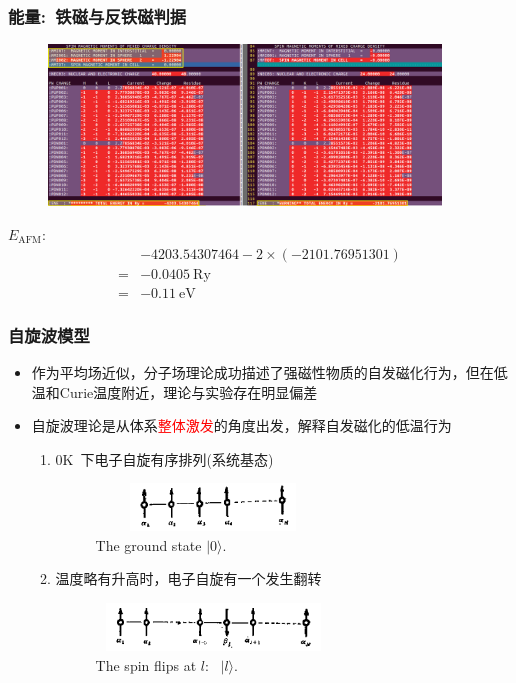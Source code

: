 {\frame
{
	\frametitle{能量:~铁磁与反铁磁判据}
\vspace*{-8pt}
\begin{figure}[h!]
\centering
\includegraphics[width=4.1in]{Figures/WIEN2k_AFM_Cr-6.png}
\label{Fig:WIEN2k_AFM-Cr-6}
\end{figure}
$E_{\mathrm{AFM}}$:
\begin{displaymath}
	\begin{aligned}
		&-4203.54307464-2\times(-2101.76951301)\\
		=&-0.0405~\mathrm{Ry}\\
		=&-0.11~\mathrm{eV}
	\end{aligned}
\end{displaymath}
}

\frame
{
	\frametitle{自旋波模型}
	\begin{itemize}
		\item 作为平均场近似，分子场理论成功描述了强磁性物质的自发磁化行为，但在低温和\textrm{Curie}温度附近，理论与实验存在明显偏差
		\item 自旋波理论是从体系\textcolor{red}{整体激发}的角度出发，解释自发磁化的低温行为
			\begin{enumerate}
				\item 0\textrm{K~}下电子自旋有序排列(系统基态)
\begin{figure}[h!]
\centering
\includegraphics[height=0.50in,width=2.45in,viewport=10 10 600 150,clip]{Figures/Mag_spinwave-0.png}
\caption{\tiny \textrm{The ground state $|0\rangle$.}}%
\label{Mag_spinwave-0}
\end{figure}
				\item 温度略有升高时，电子自旋有一个发生翻转
\begin{figure}[h!]
\centering
\includegraphics[height=0.50in,width=2.45in,viewport=10 10 680 150,clip]{Figures/Mag_spinwave-1.png}
\caption{\tiny \textrm{The spin flips at $l$:~ $|l\rangle$.}}%
\label{Mag_spinwave-1}
\end{figure}
			\end{enumerate}
	\end{itemize}
}

}
